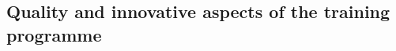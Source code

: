 \documentclass[11pt,a4paper]{article}
\begin{document}
\subsection{Quality and innovative aspects of the training programme}
\label{sec:training}
\label{sub:trainingOverview}

\processdelayedfloats
%
%
%
%
%
%
%
%
%
\end{document}
